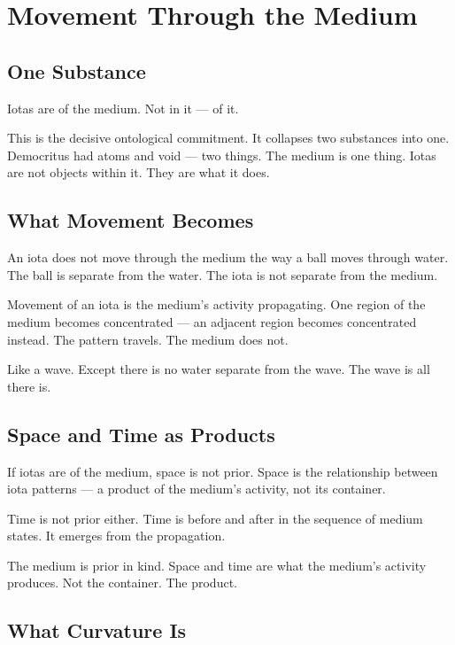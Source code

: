\documentclass[11pt]{article}
\begin{document}
\section{Movement Through the Medium}
\label{sec:org58ca82d}

\subsection{One Substance}
\label{sec:org90d1267}

Iotas are of the medium. Not in it — of it.

This is the decisive ontological commitment. It collapses two substances into
one. Democritus had atoms and void — two things. The medium is one thing. Iotas
are not objects within it. They are what it does.

\subsection{What Movement Becomes}
\label{sec:orga619972}

An iota does not move through the medium the way a ball moves through water. The
ball is separate from the water. The iota is not separate from the medium.

Movement of an iota is the medium's activity propagating. One region of the
medium becomes concentrated — an adjacent region becomes concentrated instead.
The pattern travels. The medium does not.

Like a wave. Except there is no water separate from the wave. The wave is all
there is.

\subsection{Space and Time as Products}
\label{sec:org0a45231}

If iotas are of the medium, space is not prior. Space is the relationship between
iota patterns — a product of the medium's activity, not its container.

Time is not prior either. Time is before and after in the sequence of medium
states. It emerges from the propagation.

The medium is prior in kind. Space and time are what the medium's activity
produces. Not the container. The product.

\subsection{What Curvature Is}
\label{sec:org0374200}
\end{document}
